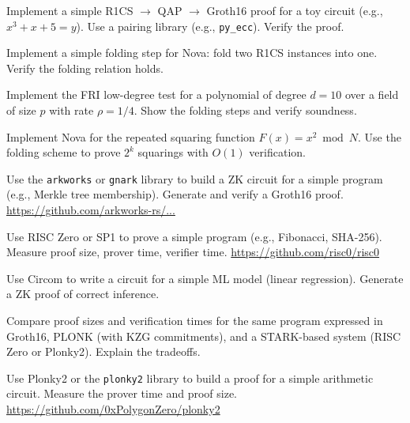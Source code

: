 \begin{exercise}[Challenge]
Implement a simple R1CS $\to$ QAP $\to$ Groth16 proof for a toy circuit (e.g., $x^3 + x + 5 = y$). Use a pairing library (e.g., \texttt{py\_ecc}). Verify the proof.
\end{exercise}

\begin{exercise}[Challenge]
Implement a simple folding step for Nova: fold two R1CS instances into one. Verify the folding relation holds.
\end{exercise}

\begin{exercise}[Challenge]
Implement the FRI low-degree test for a polynomial of degree $d=10$ over a field of size $p$ with rate $\rho=1/4$. Show the folding steps and verify soundness.
\end{exercise}

\begin{exercise}[Challenge]
Implement Nova for the repeated squaring function $F(x) = x^2 \bmod N$. Use the folding scheme to prove $2^k$ squarings with $O(1)$ verification.
\end{exercise}

\begin{exercise}[Computational]
Use the \texttt{arkworks} or \texttt{gnark} library to build a ZK circuit for a simple program (e.g., Merkle tree membership). Generate and verify a Groth16 proof. \url{https://github.com/arkworks-rs/...}
\end{exercise}

\begin{exercise}[Computational]
Use RISC Zero or SP1 to prove a simple program (e.g., Fibonacci, SHA-256). Measure proof size, prover time, verifier time. \url{https://github.com/risc0/risc0}
\end{exercise}

\begin{exercise}[Computational]
Use Circom to write a circuit for a simple ML model (linear regression). Generate a ZK proof of correct inference.
\end{exercise}

\begin{exercise}[Computational]
Compare proof sizes and verification times for the same program expressed in Groth16, PLONK (with KZG commitments), and a STARK-based system (RISC Zero or Plonky2). Explain the tradeoffs.
\end{exercise}

\begin{exercise}[Computational]
Use Plonky2 or the \texttt{plonky2} library to build a proof for a simple arithmetic circuit. Measure the prover time and proof size. \url{https://github.com/0xPolygonZero/plonky2}
\end{exercise}

